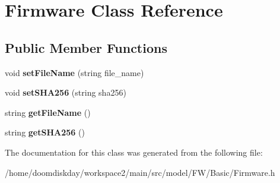 \hypertarget{classFirmware}{}\section{Firmware Class Reference}
\label{classFirmware}
\subsection*{Public Member Functions}
\begin{DoxyCompactItemize}
\item 
void {\bfseries set\+File\+Name} (string file\+\_\+name)\hypertarget{classFirmware_ab4a17f3cb1f104c87cf908fa2322bcb9}{}\label{classFirmware_ab4a17f3cb1f104c87cf908fa2322bcb9}

\item 
void {\bfseries set\+S\+H\+A256} (string sha256)\hypertarget{classFirmware_afafe8f4d217602d499424fa72bafe358}{}\label{classFirmware_afafe8f4d217602d499424fa72bafe358}

\item 
string {\bfseries get\+File\+Name} ()\hypertarget{classFirmware_a2ce07ffdb3f242a32db55437c464effa}{}\label{classFirmware_a2ce07ffdb3f242a32db55437c464effa}

\item 
string {\bfseries get\+S\+H\+A256} ()\hypertarget{classFirmware_a8cb04f299dc56f6a4787c3efd52aace0}{}\label{classFirmware_a8cb04f299dc56f6a4787c3efd52aace0}

\end{DoxyCompactItemize}


The documentation for this class was generated from the following file\+:\begin{DoxyCompactItemize}
\item 
/home/doomdiskday/workspace2/main/src/model/\+F\+W/\+Basic/Firmware.\+h\end{DoxyCompactItemize}

